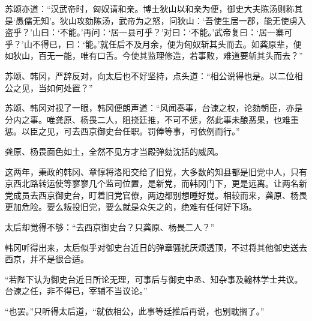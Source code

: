 苏颂亦道：“汉武帝时，匈奴请和亲。博士狄山以和亲为便，御史大夫陈汤则称其是‘愚儒无知’。狄山攻劾陈汤，武帝为之怒，问狄山：‘吾使生居一郡，能无使虏入盗乎？’山曰：‘不能。’再问：‘居一县可乎？’对曰：‘不能。’武帝复曰：‘居一寨可乎？’山不得已，曰：‘能。’就任后不及月余，便为匈奴斩其头而去。如龚原辈，便如狄山，百无一能，唯有口舌。今使其监理修造，若事败，难道要斩其头而去？”

苏颂、韩冈，严辞反对，向太后也不好坚持，点头道：“相公说得也是。以二位相公之见，当如何处置？”

苏颂、韩冈对视了一眼，韩冈便朗声道：“风闻奏事，台谏之权，论劾朝臣，亦是分内之事。唯龚原、杨畏二人，阻挠廷推，不可不惩，然此事未酿恶果，也难重惩。以臣之见，可去西京御史台任职。罚俸等事，可依例而行。”

龚原、杨畏面色如土，全然不见方才当殿弹劾沈括的威风。

这两年，秉政的韩冈、章惇将洛阳交给了旧党，大多数的知县都是旧党中人，只有京西北路转运使等寥寥几个监司位置，是新党，而韩冈门下，更是远离。让两名新党成员去西京御史台，盯着旧党官僚，两边都别想睡好觉。相较而来，龚原、杨畏更加危险。要么叛投旧党，要么就是众矢之的，绝难有任何好下场。

太后却觉得不够：“去西京御史台？只龚原、杨畏二人？”

韩冈听得出来，太后似乎对御史台近日的弹章骚扰厌烦透顶，不过将其他御史送去西京，并不是很合适。

“若陛下认为御史台近日所论无理，可事后与御史中丞、知杂事及翰林学士共议。台谏之任，非不得已，宰辅不当议论。”

“也罢。”只听得太后道，“就依相公，此事等廷推后再说，也别耽搁了。”

